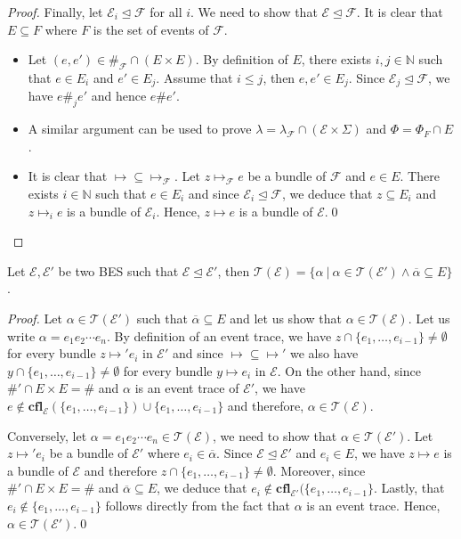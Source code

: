 \documentclass{llncs}
\newcommand{\N}{\mathbb{N}}
\newcommand{\TT}{\mathcal{T}}
\newcommand{\EE}{\mathcal{E}}
\newcommand{\FF}{\mathcal{F}}
\newcommand{\cfl}{\mathbf{cfl}}
\newcommand{\prefix}{\trianglelefteq}
\newcommand{\<}{\langle}
\renewcommand{\>}{\rangle}
\newcommand{\ov}[1]{\overline{#1}}
\newcommand{\exit}{\Phi}
\begin{document}
\begin{proof}
Finally, let $\EE_i\prefix \FF$ for all $i$. We need to show that $\EE\prefix\FF$. It is clear that $E\subseteq F$ where $F$ is the set of events of $\FF$. 
\begin{itemize}
\item Let $(e,e')\in\#_\FF\cap(E\times E)$. By definition of $E$, there exists $i,j\in\N$ such that $e\in E_i$ and $e'\in E_j$. Assume that $i\leq j$, then $e,e'\in E_j$. Since $\EE_j\prefix\FF$, we have $e\#_je'$ and hence $e\#e'$. 
\item A similar argument can be used to prove $\lambda = \lambda_\FF\cap(\EE\times\Sigma)$ and $\exit = \exit_F\cap E$.
\item It is clear that $\mapsto\subseteq\mapsto_\FF$. Let $z\mapsto_\FF e$ be a bundle of $\FF$ and $e\in E$. There exists $i\in\N$ such that $e\in E_i$ and since $\EE_i\prefix\FF$, we deduce that $z\subseteq E_i$ and $z\mapsto_i e$ is a bundle of $\EE_i$. Hence, $z\mapsto e$ is a bundle of $\EE$.\qed
\end{itemize}
\end{proof}

\begin{proposition}\label{pro:prefix-trace}
Let $\EE,\EE'$ be two BES such that $\EE\prefix\EE'$, then $\TT(\EE) = \{\alpha\ |\ \alpha\in\TT(\EE')\wedge \ov\alpha\subseteq E\}$.
\end{proposition}

\begin{proof}
Let $\alpha\in\TT(\EE')$ such that $\ov\alpha\subseteq E$ and let us show that $\alpha\in\TT(\EE)$. Let us write $\alpha = e_1e_2\cdots e_n$. By definition of an event trace, we have $z\cap\{e_1,\dots,e_{i-1}\} \neq\emptyset$ for every bundle $z\mapsto'e_i$ in $\EE'$ and since $\mapsto\subseteq\mapsto'$ we also have $y\cap\{e_1,\dots,e_{i-1}\}\neq\emptyset$ for every bundle $y\mapsto e_i$ in $\EE$. On the other hand, since $\#'\cap E\times E = \#$ and $\alpha$ is an event trace of $\EE'$, we have $e\notin\cfl_\EE(\{e_1,\dots,e_{i-1}\})\cup\{e_1,\dots,e_{i-1}\}$ and therefore, $\alpha\in\TT(\EE)$.

Conversely, let $\alpha = e_1e_2\cdots e_n\in\TT(\EE)$, we need to show that $\alpha\in\TT(\EE')$. Let $z\mapsto'e_i$ be a bundle of $\EE'$ where $e_i\in\ov\alpha$. Since $\EE\prefix\EE'$ and $e_i\in E$, we have $z\mapsto e$ is a bundle of $\EE$ and therefore $z\cap\{e_1,\dots,e_{i-1}\}\neq\emptyset$. Moreover, since $\#'\cap E\times E = \#$ and $\ov\alpha\subseteq E$, we deduce that $e_i\notin\cfl_{\EE'}(\{e_1,\dots,e_{i-1}\}$. Lastly, that $e_i\notin\{e_1,\dots,e_{i-1}\}$ follows directly from the fact that $\alpha$ is an event trace. Hence, $\alpha\in\TT(\EE')$.\qed
\end{proof}
\end{document}
